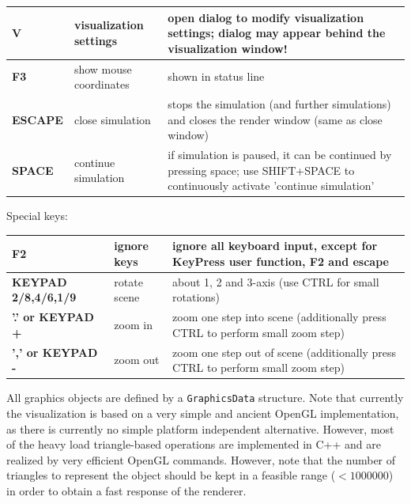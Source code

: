 \begin{center}
\begin{longtable}{| p{4cm} | p{4cm} | p{8cm} |}
	\bf V & visualization settings & open dialog to modify visualization settings; dialog may appear behind the visualization window! \\ \hline
	\bf F3 & show mouse coordinates & shown in status line \\ \hline
  \bf ESCAPE & close simulation & stops the simulation (and further simulations) and closes the render window (same as close window) \\ \hline
  \bf SPACE & continue simulation & if simulation is paused, it can be continued by pressing space; use SHIFT+SPACE to continuously activate 'continue simulation'\\ \hline
%
  \end{longtable}
\end{center}

Special keys:
\begin{center}
  \footnotesize
  \begin{longtable}{| p{4cm} | p{4cm} | p{8cm} |} 
	\hline
	\bf F2 & ignore keys & ignore all keyboard input, except for KeyPress user function, F2 and escape \\ \hline
  \bf KEYPAD 2/8,4/6,1/9 & rotate scene & about 1, 2 and 3-axis (use CTRL for small rotations) \\ \hline
  \bf '.' or KEYPAD + & zoom in & zoom one step into scene (additionally press CTRL to perform small zoom step)\\ \hline
  \bf ',' or KEYPAD - & zoom out & zoom one step out of scene (additionally press CTRL to perform small zoom step)\\ \hline
  \end{longtable}
\end{center}

\label{sec:graphicsData}
All graphics objects are defined by a \texttt{GraphicsData} structure.%
Note that currently the visualization is based on a very simple and ancient OpenGL implementation, as there is currently no simple platform independent alternative. However, most of the heavy load triangle-based operations are implemented in C++ and are realized by very efficient OpenGL commands. However, note that the number of triangles to represent the object should be kept in a feasible range ($<1000000$) in order to obtain a fast response of the renderer.

